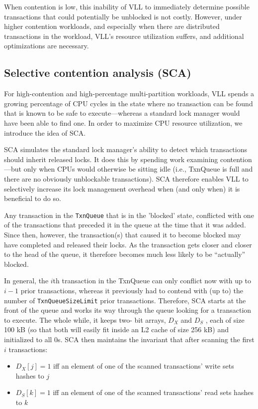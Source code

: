 \documentclass[11pt]{article}
\begin{document}
When contention is low, this inability of VLL to immediately determine possible transactions that
could potentially be unblocked is not costly. However, under higher contention workloads, and
especially when there are distributed transactions in the workload, VLL’s resource utilization
suffers, and additional optimizations are necessary.
\subsection{Selective contention analysis (SCA)}
\label{sec:org34771a2}
For high-contention and high-percentage multi-partition workloads, VLL spends a growing percentage of
CPU cycles in the state where no transaction can be found that is known to be safe to execute—whereas
a standard lock manager would have been able to find one. In order to maximize CPU resource
utilization, we introduce the idea of SCA.

SCA simulates the standard lock manager’s ability to detect which transactions should inherit released
locks. It does this by spending work examining contention—but only when CPUs would otherwise be
sitting idle (i.e., TxnQueue is full and there are no obviously unblockable transactions). SCA
therefore enables VLL to selectively increase its lock management overhead when (and only when) it is
beneficial to do so.

Any transaction in the \texttt{TxnQueue} that is in the ’blocked’ state, conflicted with one of the
transactions that preceded it in the queue at the time that it was added. Since then, however, the
transaction(s) that caused it to become blocked may have completed and released their locks. As the
transaction gets closer and closer to the head of the queue, it therefore becomes much less likely to
be “actually” blocked.

In general, the \(i\)th transaction in the TxnQueue can only conflict now with up to \(i-1\) prior
transactions, whereas it previously had to contend with (up to) the number of \texttt{TxnQueueSizeLimit} prior
transactions. Therefore, SCA starts at the front of the queue and works its way through the queue
looking for a transaction to execute. The whole while, it keeps two- bit arrays, \(D_X\) and \(D_S\) ,
each of size 100 kB (so that both will easily fit inside an L2 cache of size 256 kB) and initialized
to all 0s. SCA then maintains the invariant that after scanning the first \(i\) transactions:
\begin{itemize}
\item \(D_X[j]=1\) iff an element of one of the scanned transactions' write sets hashes to \(j\)
\item \(D_S[k]=1\) iff an element of one of the scanned transactions' read sets hashes to \(k\)
\end{itemize}
\end{document}
